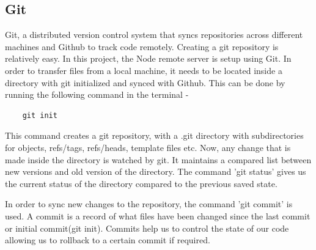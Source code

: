 \documentclass[../thesis.tex]{subfiles}
\begin{document}
	\subsection*{Git}
	Git, a distributed version control system that syncs repositories across different machines and Github to track code remotely. Creating a git repository is relatively easy. In this project, the Node remote server is setup using Git. In order to transfer files from a local machine, it needs to be located inside a directory with git initialized and synced with Github. This can be done by running the following command in the terminal -
	\begin{verbatim}
	git init
	\end{verbatim}
	
	This command creates a git repository, with a .git directory with subdirectories for objects, refs/tags, refs/heads, template files etc. Now, any change that is made inside the directory is watched by git. It maintains a compared list between new versions and old version of the directory. The command 'git status' gives us the current status of the directory compared to the previous saved state.
	\newline
	
	In order to sync new changes to the repository, the command 'git commit' is used. A commit is a record of what files have been changed since the last commit or initial commit(git init). Commits help us to control the state of our code allowing us to rollback to a certain commit if required.
	\newline
	
\end{document}
